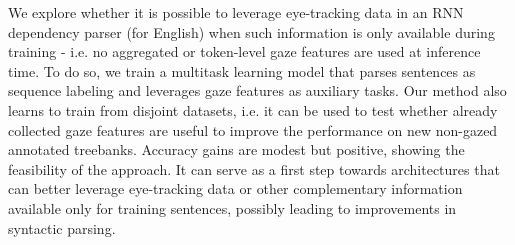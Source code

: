 We explore whether it is possible to leverage eye-tracking data in an RNN dependency parser (for  English) when such information is only available during training - i.e. no aggregated or token-level gaze features are used at inference time. To do so, we train a multitask learning model that parses sentences as sequence labeling and leverages gaze features as auxiliary tasks. Our method also learns to train from disjoint datasets, i.e. it can be used to test whether already collected gaze features are useful to improve the performance on new non-gazed annotated treebanks. Accuracy gains are modest but positive, showing the feasibility of the approach. It can serve as a first step towards architectures that can better leverage eye-tracking data or other complementary information available only for training sentences, possibly leading to improvements in syntactic parsing.